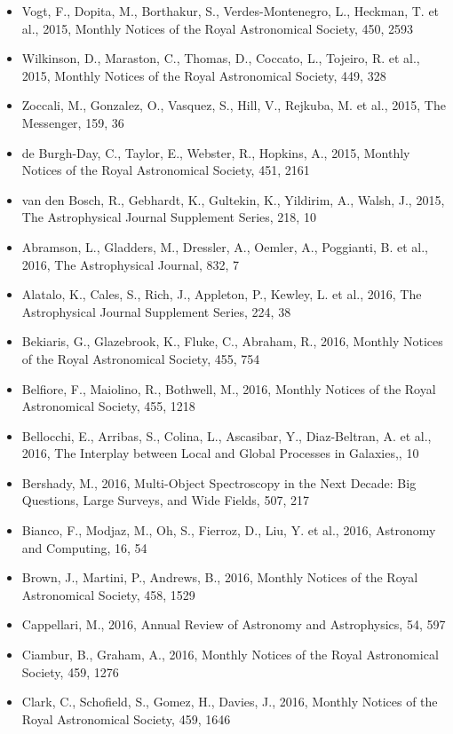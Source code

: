 \documentclass{letter}
\begin{document}
\begin{enumerate}
\begin{itemize}
\item Vogt, F., Dopita, M., Borthakur, S., Verdes-Montenegro, L., Heckman, T. et al., 2015, Monthly Notices of the Royal Astronomical Society, 450, 2593
\item Wilkinson, D., Maraston, C., Thomas, D., Coccato, L., Tojeiro, R. et al., 2015, Monthly Notices of the Royal Astronomical Society, 449, 328
\item Zoccali, M., Gonzalez, O., Vasquez, S., Hill, V., Rejkuba, M. et al., 2015, The Messenger, 159, 36
\item de Burgh-Day, C., Taylor, E., Webster, R., Hopkins, A., 2015, Monthly Notices of the Royal Astronomical Society, 451, 2161
\item van den Bosch, R., Gebhardt, K., Gultekin, K., Yildirim, A., Walsh, J., 2015, The Astrophysical Journal Supplement Series, 218, 10
\item Abramson, L., Gladders, M., Dressler, A., Oemler, A., Poggianti, B. et al., 2016, The Astrophysical Journal, 832, 7
\item Alatalo, K., Cales, S., Rich, J., Appleton, P., Kewley, L. et al., 2016, The Astrophysical Journal Supplement Series, 224, 38
\item Bekiaris, G., Glazebrook, K., Fluke, C., Abraham, R., 2016, Monthly Notices of the Royal Astronomical Society, 455, 754
\item Belfiore, F., Maiolino, R., Bothwell, M., 2016, Monthly Notices of the Royal Astronomical Society, 455, 1218
\item Bellocchi, E., Arribas, S., Colina, L., Ascasibar, Y., Diaz-Beltran, A. et al., 2016, The Interplay between Local and Global Processes in Galaxies,, 10
\item Bershady, M., 2016, Multi-Object Spectroscopy in the Next Decade: Big Questions, Large Surveys, and Wide Fields, 507, 217
\item Bianco, F., Modjaz, M., Oh, S., Fierroz, D., Liu, Y. et al., 2016, Astronomy and Computing, 16, 54
\item Brown, J., Martini, P., Andrews, B., 2016, Monthly Notices of the Royal Astronomical Society, 458, 1529
\item Cappellari, M., 2016, Annual Review of Astronomy and Astrophysics, 54, 597
\item Ciambur, B., Graham, A., 2016, Monthly Notices of the Royal Astronomical Society, 459, 1276
\item Clark, C., Schofield, S., Gomez, H., Davies, J., 2016, Monthly Notices of the Royal Astronomical Society, 459, 1646

\end{itemize}
\end{enumerate}
\end{document}
